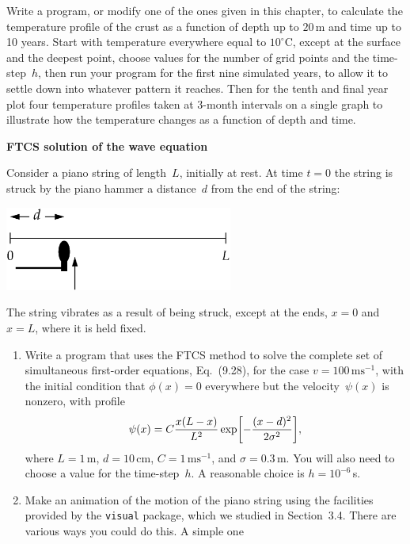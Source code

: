 \documentclass[12pt]{article}
\begin{document}
\begin{exercises}
Write a program, or modify one of the ones given in this chapter, to
calculate the temperature profile of the crust as a function of depth up to
$20\,$m and time up to 10 years.  Start with temperature everywhere equal
to $10^\circ$C, except at the surface and the deepest point, choose values
for the number of grid points and the time-step~$h$, then run your program
for the first nine simulated years, to allow it to settle down into
whatever pattern it reaches.  Then for the tenth and final year plot four
temperature profiles taken at 3-month intervals on a single graph to
illustrate how the temperature changes as a function of depth and time.



\exercise \textbf{FTCS solution of the wave equation}

\exskip Consider a piano string of
length~$L$, initially at rest.  At time $t=0$ the string is struck by the
piano hammer a distance~$d$ from the end of the string:
\bigskip
\begin{center}
\includegraphics[width=7.5cm]{piano.eps}
\end{center}
\bigskip The string vibrates as a result of being struck, except at
the ends, $x=0$ and $x=L$, where it is held fixed.
\begin{enumerate}\setlength{\itemsep}{0pt}
\item Write a program that uses the FTCS method to solve the complete set
  of simultaneous first-order equations, Eq.~(9.28), for the case
  $v=100\,\mathrm{ms}^{-1}$, with the initial condition that $\phi(x)=0$
  everywhere but the velocity~$\psi(x)$ is nonzero, with profile
\begin{displaymath}
\psi(x) = C {x(L-x)\over L^2} \exp \biggl[ -{(x-d)^2\over2\sigma^2} \biggr],
\end{displaymath}
where $L=1\,$m, $d=10\,$cm, $C=1\,\mathrm{ms}^{-1}$, and $\sigma=0.3\,$m.
You will also need to choose a value for the time-step~$h$.  A reasonable
choice is $h=10^{-6}\,$s.
\item Make an animation of the motion of the piano string using the
  facilities provided by the \verb|visual| package, which we studied in
  Section~3.4.  There are various ways you could do this.  A simple one

\end{enumerate}
\end{exercises}
\end{document}
